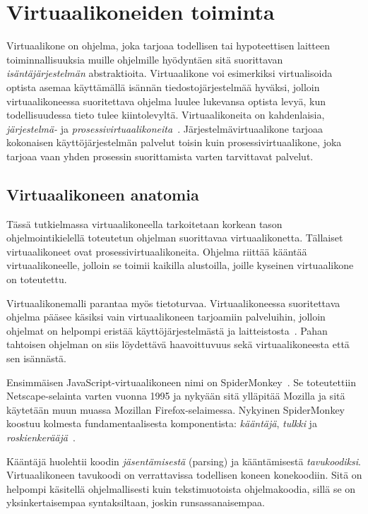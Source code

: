 \section{Virtuaalikoneiden toiminta}

Virtuaalikone on ohjelma, joka tarjoaa todellisen tai hypoteettisen laitteen toiminnallisuuksia muille ohjelmille hyödyntäen sitä suorittavan \textit{isäntäjärjestelmän} abstraktioita. Virtuaalikone voi esimerkiksi virtualisoida optista asemaa käyttämällä isännän tiedostojärjestelmää hyväksi, jolloin virtuaalikoneessa suoritettava ohjelma luulee lukevansa optista levyä, kun todellisuudessa tieto tulee kiintolevyltä. Virtuaalikoneita on kahdenlaisia, \textit{järjestelmä-} ja \textit{prosessivirtuaalikoneita}~\cite[s.~33]{vms}. Järjestelmävirtuaalikone tarjoaa kokonaisen käyttöjärjestelmän palvelut toisin kuin prosessivirtuaalikone, joka tarjoaa vaan yhden prosessin suorittamista varten tarvittavat palvelut.

\subsection{Virtuaalikoneen anatomia}

Tässä tutkielmassa virtuaalikoneella tarkoitetaan korkean tason ohjelmointikielellä toteutetun ohjelman suorittavaa virtuaalikonetta. Tällaiset virtuaalikoneet ovat prosessivirtuaalikoneita. Ohjelma riittää kääntää virtuaalikoneelle, jolloin se toimii kaikilla alustoilla, joille kyseinen virtuaalikone on toteutettu.

Virtuaalikonemalli parantaa myös tietoturvaa. Virtuaalikoneessa suoritettava ohjelma pääsee käsiksi vain virtuaalikoneen tarjoamiin palveluihin, jolloin ohjelmat on helpompi eristää käyttöjärjestelmästä ja laitteistosta~\cite[s.~36]{vms}. Pahan tahtoisen ohjelman on siis löydettävä haavoittuvuus sekä virtuaalikoneesta että sen isännästä.

Ensimmäisen JavaScript-virtuaalikoneen nimi on SpiderMonkey~\cite{spidermonkey}. Se toteutettiin Netscape-selainta varten vuonna 1995 ja nykyään sitä ylläpitää Mozilla ja sitä käytetään muun muassa Mozillan Firefox-selaimessa. Nykyinen SpiderMonkey koostuu kolmesta fundamentaalisesta komponentista: \textit{kääntäjä}, \textit{tulkki} ja \textit{roskienkerääjä}~\cite{spidermonkeydesign}.

Kääntäjä huolehtii koodin \textit{jäsentämisestä} (parsing) ja kääntämisestä \textit{tavukoodiksi}. Virtuaalikoneen tavukoodi on verrattavissa todellisen koneen konekoodiin. Sitä on helpompi käsitellä ohjelmallisesti kuin tekstimuotoista ohjelmakoodia, sillä se on yksinkertaisempaa syntaksiltaan, joskin runsassanaisempaa.

